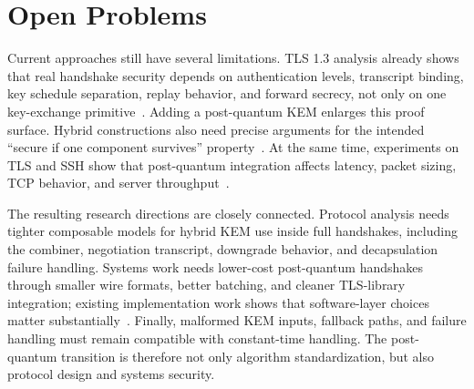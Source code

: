 \section{Open Problems}

Current approaches still have several limitations. TLS 1.3 analysis already shows that real handshake security depends on authentication levels, transcript binding, key schedule separation, replay behavior, and forward secrecy, not only on one key-exchange primitive~\cite{dowling2021cryptographic}. Adding a post-quantum KEM enlarges this proof surface. Hybrid constructions also need precise arguments for the intended ``secure if one component survives'' property~\cite{dowling2020many}. At the same time, experiments on TLS and SSH show that post-quantum integration affects latency, packet sizing, TCP behavior, and server throughput~\cite{sikeridis2020assessing}.

The resulting research directions are closely connected. Protocol analysis needs tighter composable models for hybrid KEM use inside full handshakes, including the combiner, negotiation transcript, downgrade behavior, and decapsulation failure handling. Systems work needs lower-cost post-quantum handshakes through smaller wire formats, better batching, and cleaner TLS-library integration; existing implementation work shows that software-layer choices matter substantially~\cite{bernstein2022opensslntru}. Finally, malformed KEM inputs, fallback paths, and failure handling must remain compatible with constant-time handling. The post-quantum transition is therefore not only algorithm standardization, but also protocol design and systems security.
